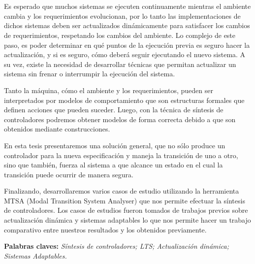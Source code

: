 \chapter*{\runtitulo}

\noindent Es esperado que muchos sistemas se ejecuten continuamente mientras el ambiente cambia y los requerimientos
evolucionan, por lo tanto las implementaciones de dichos sistemas deben ser actualizados dinámicamente para satisfacer
los cambios de requerimientos, respetando los cambios del ambiente. Lo complejo de este paso, es poder determinar en qué
puntos de la ejecución previa es seguro hacer la actualización, y si es seguro, cómo deberá seguir ejecutando el nuevo
sistema. A su vez, existe la necesidad de desarrollar técnicas que permitan actualizar un sistema sin frenar o
interrumpir la ejecución del sistema.

\noindent Tanto la máquina, cómo el ambiente y los requerimientos, pueden ser interpretados por modelos de
comportamiento que son estructuras formales que definen acciones que pueden suceder. Luego, con la técnica de síntesis de
controladores podremos obtener modelos de forma correcta debido a que son obtenidos mediante construcciones.

\noindent En esta tesis presentaremos una solución general, que no sólo produce un controlador para la nueva
especificación y maneja la transición de uno a otro, sino que también, fuerza al sistema a que alcance un estado en el
cual la transición puede ocurrir de manera segura.

\noindent Finalizando, desarrollaremos varios casos de estudio utilizando la herramienta MTSA (Modal Transition System
Analyser) que nos permite efectuar la síntesis de controladores. Los casos de estudios fueron tomados de trabajos
previos sobre actualización dinámica y sistemas adaptables lo que nos permite hacer un trabajo comparativo entre
nuestros resultados y los obtenidos previamente.

 
\bigskip

\noindent\textbf{Palabras claves:} \textit{Síntesis de controladores; LTS; Actualización dinámica; Sistemas Adaptables.}
